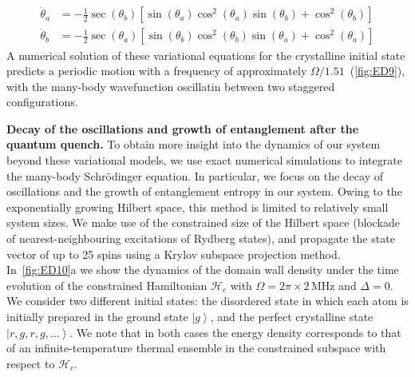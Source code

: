 \documentclass[prl,nobalancelastpage,twocolumn,superscriptaddress,nofootinbib]{revtex4}
\newcommand{\ket}[1]{\left|#1\right\rangle}
\newcommand{\ham}{\mathcal{H}}
\begin{document}
\begin{footnotesize}
\begin{equation}
\begin{aligned}
\dot\theta_a&=-\frac{1}{2} \sec \left(\theta _b\right) \left[\sin \left(\theta _a\right) \cos
   ^2\left(\theta _a\right) \sin \left(\theta _b\right)+\cos ^2\left(\theta
   _b\right)\right]\\
   \dot\theta_b&=-\frac{1}{2} \sec \left(\theta _a\right) \left[\sin \left(\theta _b\right) \cos
   ^2\left(\theta _b\right) \sin \left(\theta _a\right)+\cos ^2\left(\theta
   _a\right)\right]
   \end{aligned}
   \end{equation}
A numerical solution of these variational equations for the crystalline initial
state predicts a periodic motion with a frequency of approximately
$\Omega/1.51$~(\ref{fig:ED9}), with the many-body wavefunction
oscillatin between two staggered configurations.  

\noindent
\textbf{Decay of the oscillations and growth of entanglement after the quantum quench.}
To obtain more insight into the dynamics of our system beyond these
variational models, we use exact numerical simulations to integrate the
many-body Schr\"odinger equation. In particular, we focus on the decay of
oscillations and the growth of entanglement entropy in our system. Owing to the
exponentially growing Hilbert space, this method is limited to relatively small
system sizes.  We make use of the constrained size of the Hilbert space
(blockade of nearest-neighbouring excitations of Rydberg states), and propagate
the state vector of up to 25 spins using a Krylov subspace projection method.
In~\ref{fig:ED10}a we show the dynamics of the domain wall density under the
time evolution of the constrained Hamiltonian $\ham_c$ with $\Omega=2\pi\times
2 \,$MHz and $\Delta=0$.  We consider two different initial states: the
disordered state in which each atom is initially prepared in the ground state
$\ket{g}$, and the perfect crystalline state $\ket{r,g,r,g,\dots}$. We note
that in both cases the energy density corresponds to that of an
infinite-temperature thermal ensemble in the constrained subspace with respect
to $\ham_c$.


\end{footnotesize}
\end{document}
